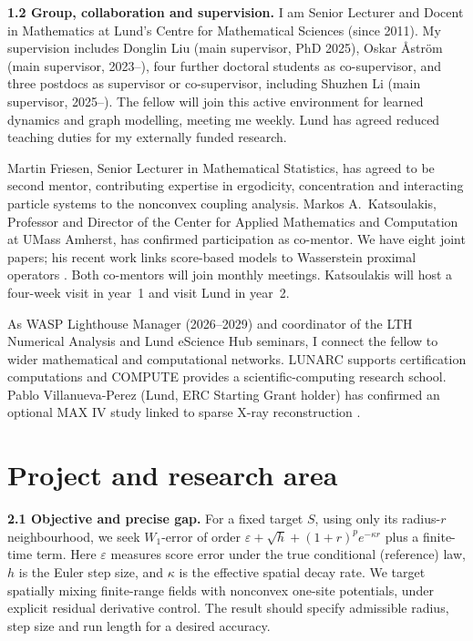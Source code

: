 \documentclass[12pt,a4paper]{article}
\newcommand{\W}{W_1}
\begin{document}
\textbf{1.2 Group, collaboration and supervision.}
I am Senior Lecturer and Docent in Mathematics at Lund's Centre for Mathematical Sciences (since 2011). My supervision includes Donglin Liu (main supervisor, PhD 2025), Oskar \AA{}str\"om (main supervisor, 2023--), four further doctoral students as co-supervisor, and three postdocs as supervisor or co-supervisor, including Shuzhen Li (main supervisor, 2025--). The fellow will join this active environment for learned dynamics and graph modelling, meeting me weekly. Lund has agreed reduced teaching duties for my externally funded research.

Martin Friesen, Senior Lecturer in Mathematical Statistics, has agreed to be second mentor, contributing expertise in ergodicity, concentration and interacting particle systems to the nonconvex coupling analysis. Markos A.\ Katsoulakis, Professor and Director of the Center for Applied Mathematics and Computation at UMass Amherst, has confirmed participation as co-mentor. We have eight joint papers; his recent work links score-based models to Wasserstein proximal operators \cite{ZLLKO24}. Both co-mentors will join monthly meetings. Katsoulakis will host a four-week visit in year~1 and visit Lund in year~2.

As WASP Lighthouse Manager (2026--2029) and coordinator of the LTH Numerical Analysis and Lund eScience Hub seminars, I connect the fellow to wider mathematical and computational networks. LUNARC supports certification computations and COMPUTE provides a scientific-computing research school. Pablo Villanueva-Perez (Lund, ERC Starting Grant holder) has confirmed an optional MAX IV study linked to sparse X-ray reconstruction \cite{Zhang25}.

\section{Project and research area}
\textbf{2.1 Objective and precise gap.}
For a fixed target $S$, using only its radius-$r$ neighbourhood, we seek $\W$-error of order $\varepsilon+\sqrt h+(1+r)^p e^{-\kappa r}$ plus a finite-time term. Here $\varepsilon$ measures score error under the true conditional (reference) law, $h$ is the Euler step size, and $\kappa$ is the effective spatial decay rate. We target spatially mixing finite-range fields with nonconvex one-site potentials, under explicit residual derivative control. The result should specify admissible radius, step size and run length for a desired accuracy.
\end{document}
